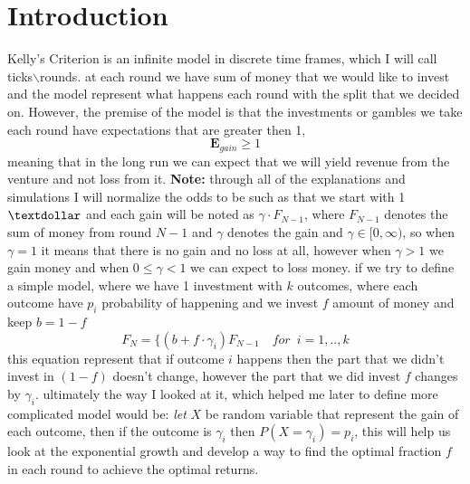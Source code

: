 \documentclass{article}
\begin{document}
	\section{Introduction}
	Kelly's Criterion is an infinite model in discrete time frames, which I will call ticks$\backslash$rounds.
	at each round we have sum of money that we would like to invest and the model represent what happens each round with the split that we decided on.\newline
	However, the premise of the model is that the investments or gambles we take each round have expectations that are greater then 1,
	$$\textbf{E}_{gain} \ge 1$$
	meaning that in the long run we can expect that we will yield revenue from the venture and not loss from it.
	\newline
	\textbf{Note:} through all of the explanations and simulations I will normalize the odds to be such as that we start with 1$\textdollar$ and each gain will be noted as $\gamma\cdot F_{N-1}$, where $F_{N-1}$ denotes the sum of money from round $N-1$ and $\gamma$ denotes the gain and $\gamma\in[0,\infty)$, so when $\gamma = 1$ it means that there is no gain and no loss at all, however when 
	$\gamma > 1$ we gain money and when $ 0\le \gamma < 1$ we can expect to loss money.
	\newline\newline
	if we try to define a simple model, where we have 1 investment with $k$ outcomes, where each outcome have $p_i$ probability of happening and we invest $f$ amount of money and keep $b=1-f$ 
	\begin{equation}
		F_N = \Bigg \{
	(b + f\cdot \gamma _i)F_{N-1} \quad for\enspace i=1,..,k
	\end{equation}
	this equation represent that if outcome $i$ happens then the part that we didn't invest in $(1-f)$ doesn't change, however the part that we did invest $f$ changes by $\gamma_i$.
	\newline
	ultimately the way I looked at it, which helped me later to define more complicated model would be:\newline
	\textit{let} $X$ be random variable that represent the gain of each outcome, then if the outcome is $\gamma_i$ then $P(X=\gamma_i) = p_i$, this will help us look at the exponential growth and develop a way to find the optimal fraction $f$ in each round to achieve the optimal returns.
	
\end{document}
